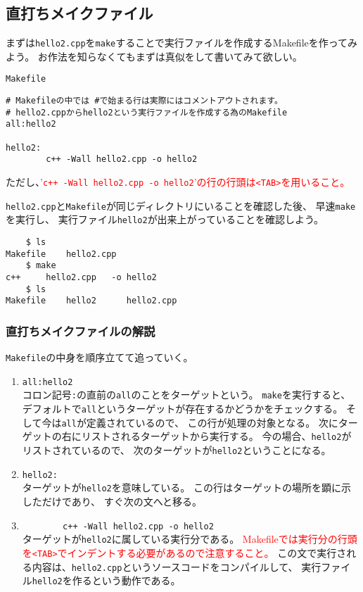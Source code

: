  
 \clearpage
 \subsection{直打ちメイクファイル}
まずは\texttt{hello2.cpp}を\verb|make|することで実行ファイルを作成するMakefileを作ってみよう。
お作法を知らなくてもまずは真似をして書いてみて欲しい。
\begin{itembox}{\texttt{Makefile}}
\begin{verbatim}
# Makefileの中では #で始まる行は実際にはコメントアウトされます。
# hello2.cppからhello2という実行ファイルを作成する為のMakefile
all:hello2

hello2:
        c++ -Wall hello2.cpp -o hello2
\end{verbatim}
\end{itembox}
ただし、\textcolor{red}{'\texttt{c++ -Wall hello2.cpp -o hello2}'の行の行頭は\texttt{<TAB>}を用いること。}

\texttt{hello2.cpp}と\texttt{Makefile}が同じディレクトリにいることを確認した後、
早速\verb|make|を実行し、
実行ファイル\texttt{hello2}が出来上がっていることを確認しよう。
\begin{verbatim}
	$ ls
Makefile	hello2.cpp
	$ make
c++     hello2.cpp   -o hello2
	$ ls
Makefile	hello2		hello2.cpp
\end{verbatim}


\subsubsection*{直打ちメイクファイルの解説}
\texttt{Makefile}の中身を順序立てて追っていく。
\begin{enumerate}
 \item \verb|all:hello2| \\
       コロン記号\verb|:|の直前の\verb|all|のことをターゲットという。
       \verb|make|を実行すると、デフォルトで\verb|all|というターゲットが存在するかどうかをチェックする。
       そして今は\verb|all|が定義されているので、
       この行が処理の対象となる。
       次にターゲットの右にリストされるターゲットから実行する。
       今の場合、\verb|hello2|がリストされているので、
       次のターゲットが\verb|hello2|ということになる。

 \item \verb|hello2:| \\
       ターゲットが\verb|hello2|を意味している。
       この行はターゲットの場所を顕に示しただけであり、
       すぐ次の文へと移る。
       
\item \verb|        c++ -Wall hello2.cpp -o hello2| \\
       ターゲットが\verb|hello2|に属している実行分である。
      \textcolor{red}{Makefileでは実行分の行頭を\texttt{<TAB>}でインデントする必要があるので注意すること。}
      この文で実行される内容は、\verb|hello2.cpp|というソースコードをコンパイルして、
      実行ファイル\verb|hello2|を作るという動作である。
\end{enumerate}



